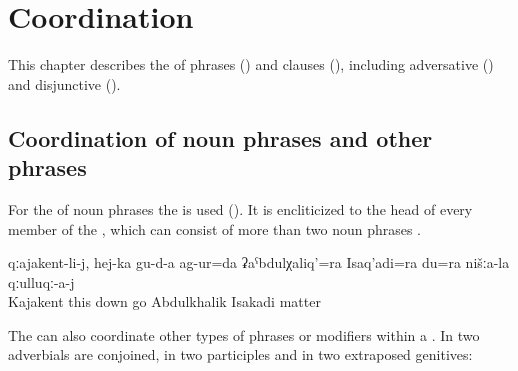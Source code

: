 \chapter{Coordination}
\label{cpt:Coordination}

This chapter describes the  of phrases () and clauses (), including adversative () and disjunctive  ().

\section{Coordination of noun phrases and other phrases}
\label{sec:Coordination of noun phrases and other phrases}

For the  of noun phrases the   is used (). It is encliticized to the head of every member of the , which can consist of more than two noun phrases .

\begin{exe}
	\ex	\label{ex:‎‎‎To Kajakent, from here up downwards we travelled, Abdukhalik, Isakadi and me, for our matters}
	\gll	qːajakent-li-j,	hej-ka	gu-d-a	ag-ur=da	ʡaˁbdulχaliq'=ra	Isaq'adi=ra	du=ra	nišːa-la	qːulluqː-a-j\\
		Kajakent	this	down	go	Abdulkhalik\tsc{=add} Isakadi			matter\\
	\glt	{}
\end{exe}

The  can also coordinate other types of phrases or modifiers within a . In  two adverbials are conjoined, in  two participles and in  two extraposed genitives:

